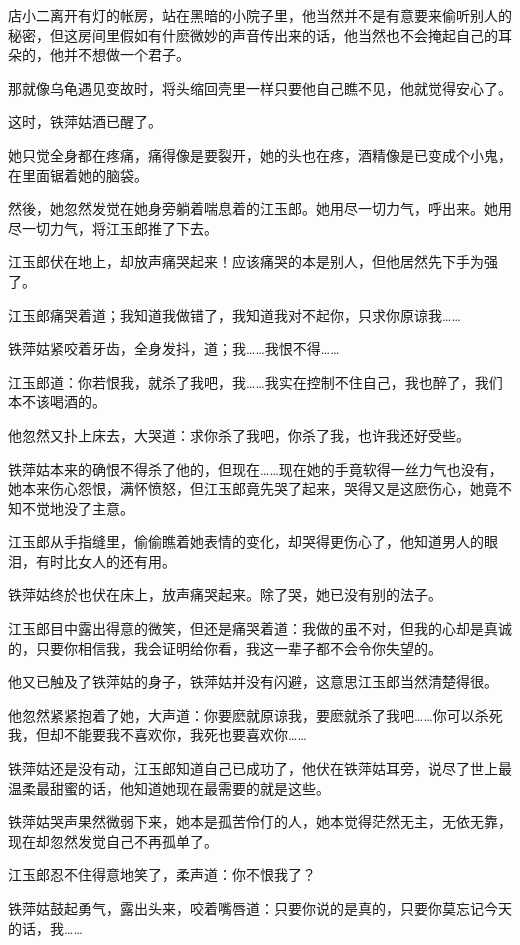 \documentclass[12pt,oneside]{book}
\begin{document}
店小二离开有灯的帐房，站在黑暗的小院子里，他当然并不是有意要来偷听别人的秘密，但这房间里假如有什麽微妙的声音传出来的话，他当然也不会掩起自己的耳朵的，他并不想做一个君子。

那就像乌龟遇见变故时，将头缩回壳里一样只要他自己瞧不见，他就觉得安心了。

这时，铁萍姑酒已醒了。

她只觉全身都在疼痛，痛得像是要裂开，她的头也在疼，酒精像是已变成个小鬼，在里面锯着她的脑袋。

然後，她忽然发觉在她身旁躺着喘息着的江玉郎。她用尽一切力气，呼出来。她用尽一切力气，将江玉郎推了下去。

江玉郎伏在地上，却放声痛哭起来！应该痛哭的本是别人，但他居然先下手为强了。

江玉郎痛哭着道；我知道我做错了，我知道我对不起你，只求你原谅我\ldots\ldots{}

铁萍姑紧咬着牙齿，全身发抖，道；我\ldots\ldots 我恨不得\ldots\ldots{}

江玉郎道：你若恨我，就杀了我吧，我\ldots\ldots 我实在控制不住自己，我也醉了，我们本不该喝酒的。

他忽然又扑上床去，大哭道：求你杀了我吧，你杀了我，也许我还好受些。

铁萍姑本来的确恨不得杀了他的，但现在\ldots\ldots 现在她的手竟软得一丝力气也没有，她本来伤心怨恨，满怀愤怒，但江玉郎竟先哭了起来，哭得又是这麽伤心，她竟不知不觉地没了主意。

江玉郎从手指缝里，偷偷瞧着她表情的变化，却哭得更伤心了，他知道男人的眼泪，有时比女人的还有用。

铁萍姑终於也伏在床上，放声痛哭起来。除了哭，她已没有别的法子。

江玉郎目中露出得意的微笑，但还是痛哭着道：我做的虽不对，但我的心却是真诚的，只要你相信我，我会证明给你看，我这一辈子都不会令你失望的。

他又已触及了铁萍姑的身子，铁萍姑并没有闪避，这意思江玉郎当然清楚得很。

他忽然紧紧抱着了她，大声道：你要麽就原谅我，要麽就杀了我吧\ldots\ldots 你可以杀死我，但却不能要我不喜欢你，我死也要喜欢你\ldots\ldots{}

铁萍姑还是没有动，江玉郎知道自己已成功了，他伏在铁萍姑耳旁，说尽了世上最温柔最甜蜜的话，他知道她现在最需要的就是这些。

铁萍姑哭声果然微弱下来，她本是孤苦伶仃的人，她本觉得茫然无主，无依无靠，现在却忽然发觉自己不再孤单了。

江玉郎忍不住得意地笑了，柔声道：你不恨我了？

铁萍姑鼓起勇气，露出头来，咬着嘴唇道：只要你说的是真的，只要你莫忘记今天的话，我\ldots\ldots{}
\end{document}
